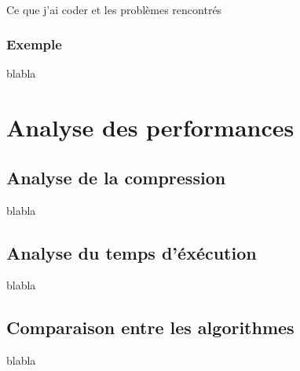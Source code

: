 \documentclass{report}
\begin{document}
\paragraph*{}
 Ce que j'ai coder et les problèmes rencontrés

 
\section*{Exemple}
blabla
\part{Analyse des performances}
\chapter*{Analyse de la compression}
blabla
\chapter*{Analyse du temps d'éxécution }
blabla
\chapter*{Comparaison entre les algorithmes}
blabla
\end{document}
